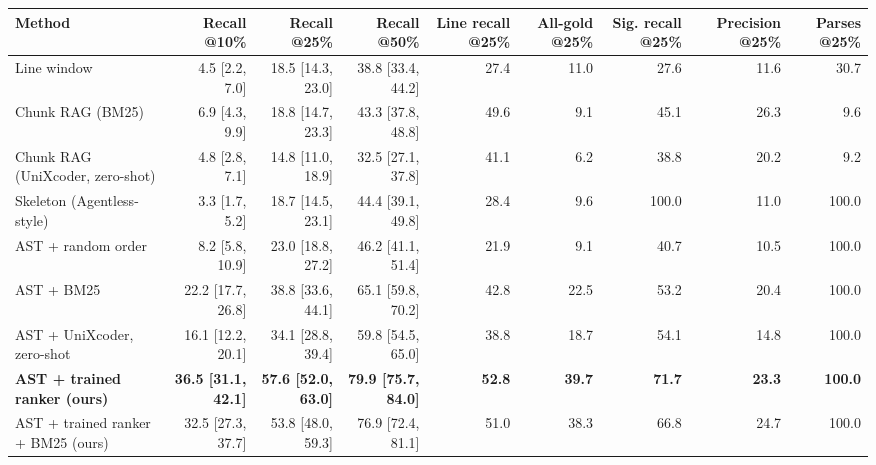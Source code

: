 \begin{tabular}{lrrrrrrrr}
\toprule
Method & Recall @10\% & Recall @25\% & Recall @50\% & Line recall @25\% & All-gold @25\% & Sig. recall @25\% & Precision @25\% & Parses @25\% \\
\midrule
Line window & 4.5 [2.2, 7.0] & 18.5 [14.3, 23.0] & 38.8 [33.4, 44.2] & 27.4 & 11.0 & 27.6 & 11.6 & 30.7 \\
Chunk RAG (BM25) & 6.9 [4.3, 9.9] & 18.8 [14.7, 23.3] & 43.3 [37.8, 48.8] & 49.6 & 9.1 & 45.1 & 26.3 & 9.6 \\
Chunk RAG (UniXcoder, zero-shot) & 4.8 [2.8, 7.1] & 14.8 [11.0, 18.9] & 32.5 [27.1, 37.8] & 41.1 & 6.2 & 38.8 & 20.2 & 9.2 \\
Skeleton (Agentless-style) & 3.3 [1.7, 5.2] & 18.7 [14.5, 23.1] & 44.4 [39.1, 49.8] & 28.4 & 9.6 & 100.0 & 11.0 & 100.0 \\
AST + random order & 8.2 [5.8, 10.9] & 23.0 [18.8, 27.2] & 46.2 [41.1, 51.4] & 21.9 & 9.1 & 40.7 & 10.5 & 100.0 \\
AST + BM25 & 22.2 [17.7, 26.8] & 38.8 [33.6, 44.1] & 65.1 [59.8, 70.2] & 42.8 & 22.5 & 53.2 & 20.4 & 100.0 \\
AST + UniXcoder, zero-shot & 16.1 [12.2, 20.1] & 34.1 [28.8, 39.4] & 59.8 [54.5, 65.0] & 38.8 & 18.7 & 54.1 & 14.8 & 100.0 \\
\textbf{AST + trained ranker (ours)} & \textbf{36.5 [31.1, 42.1]} & \textbf{57.6 [52.0, 63.0]} & \textbf{79.9 [75.7, 84.0]} & \textbf{52.8} & \textbf{39.7} & \textbf{71.7} & \textbf{23.3} & \textbf{100.0} \\
AST + trained ranker + BM25 (ours) & 32.5 [27.3, 37.7] & 53.8 [48.0, 59.3] & 76.9 [72.4, 81.1] & 51.0 & 38.3 & 66.8 & 24.7 & 100.0 \\
\bottomrule
\end{tabular}
